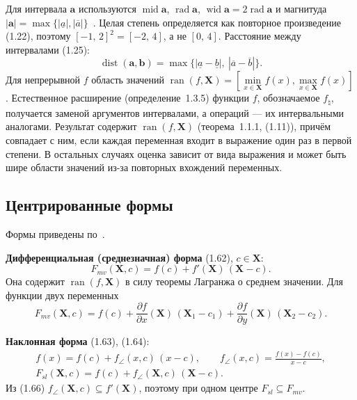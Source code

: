 \documentclass[a4paper, 14pt]{extarticle}
\begin{document}
Для интервала $\mathbf{a}$ используются $\operatorname{mid}\mathbf{a}$, $\operatorname{rad}\mathbf{a}$, $\operatorname{wid}\mathbf{a} = 2\operatorname{rad}\mathbf{a}$ и магнитуда $|\mathbf{a}| = \max\{|\underline{a}|, |\overline{a}|\}$~\cite[с.~25--27]{bazhenov}. Целая степень определяется как повторное произведение (1.22), поэтому $[-1,\,2]^2 = [-2,\,4]$, а не $[0,\,4]$. Расстояние между интервалами (1.25):
\begin{equation*}
    \operatorname{dist}(\mathbf{a}, \mathbf{b}) = \max\{|\underline{a} - \underline{b}|,\ |\overline{a} - \overline{b}|\}.
\end{equation*}
Для непрерывной $f$ область значений $\operatorname{ran}(f, \mathbf{X}) = \left[ \min\limits_{x\in \mathbf{X}} f(x), \max\limits_{x\in \mathbf{X}} f(x) \right]$. Естественное расширение (определение~1.3.5) функции $f$, обозначаемое $f_\natural$, получается заменой аргументов интервалами, а операций --- их интервальными аналогами. Результат содержит $\operatorname{ran}(f, \mathbf{X})$ (теорема~1.1.1, (1.11)), причём совпадает с ним, если каждая переменная входит в выражение один раз в первой степени. В остальных случаях оценка зависит от вида выражения \cite[с.~23, 64--66]{bazhenov} и может быть шире области значений из-за повторных вхождений переменных.

\subsection{Центрированные формы}

Формы приведены по~\cite[с.~73--78]{bazhenov}.

\textbf{Дифференциальная (среднезначная) форма} (1.62), $c \in \mathbf{X}$:
\begin{equation*}
    F_{mv}(\mathbf{X}, c) = f(c) + f'(\mathbf{X})\,(\mathbf{X} - c).
\end{equation*}
Она содержит $\operatorname{ran}(f, \mathbf{X})$ в силу теоремы Лагранжа о среднем значении. Для функции двух переменных
\begin{equation*}
    F_{mv}(\mathbf{X}, c) = f(c) + \frac{\partial f}{\partial x}(\mathbf{X})\,(\mathbf{X}_1 - c_1) + \frac{\partial f}{\partial y}(\mathbf{X})\,(\mathbf{X}_2 - c_2).
\end{equation*}

\textbf{Наклонная форма} (1.63), (1.64):
\begin{gather*}
    f(x) = f(c) + f_{\angle}(x, c)\,(x - c), \qquad f_{\angle}(x, c) = \frac{f(x) - f(c)}{x - c},\\
    F_{sl}(\mathbf{X}, c) = f(c) + f_{\angle}(\mathbf{X}, c)\,(\mathbf{X} - c).
\end{gather*}
Из (1.66) $f_{\angle}(\mathbf{X}, c) \subseteq f'(\mathbf{X})$, поэтому при одном центре $F_{sl} \subseteq F_{mv}$.
\end{document}
